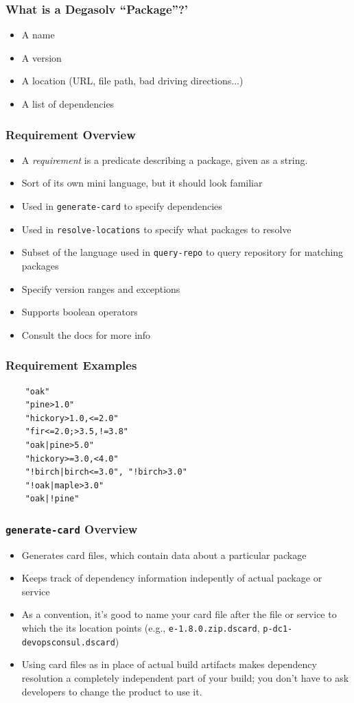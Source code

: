 \documentclass{beamer}
\begin{document}
\begin{frame}
  \frametitle{What is a Degasolv ``Package''?'}
  \begin{itemize}
  \item A name
  \item A version
  \item A location (URL, file path, bad driving directions...)
  \item A list of dependencies
  \end{itemize}
\end{frame}
\begin{frame}
  \frametitle{Requirement Overview}
  \begin{itemize}
      \item A \textit{requirement} is a predicate describing a package, given
          as a string.
  \item Sort of its own mini language, but it should look familiar
  \item Used in \texttt{generate-card} to specify dependencies
  \item Used in \texttt{resolve-locations} to specify what packages to resolve
  \item Subset of the language used in \texttt{query-repo} to query repository
      for matching packages
\item Specify version ranges and exceptions
  \item Supports boolean operators
  \item Consult the docs for more info
  \end{itemize}
\end{frame}
\begin{frame}[fragile]
  \frametitle{Requirement Examples}
\begin{verbatim}
    "oak"
    "pine>1.0"
    "hickory>1.0,<=2.0"
    "fir<=2.0;>3.5,!=3.8"
    "oak|pine>5.0"
    "hickory>=3.0,<4.0"
    "!birch|birch<=3.0", "!birch>3.0"
    "!oak|maple>3.0"
    "oak|!pine"
\end{verbatim}
\end{frame}
\begin{frame}
  \frametitle{\texttt{generate-card} Overview}
  \begin{itemize}
  \item Generates card files, which contain data about a particular package
  \item Keeps track of dependency information indepently of actual package or
      service
  \item As a convention, it's good to name your card file after the file or
      service to which the its location points (e.g.,
          \texttt{e-1.8.0.zip.dscard}, \texttt{p-dc1-devopsconsul.dscard})
  \item Using card files as in place of actual build artifacts makes
    dependency resolution a completely independent part of your build; you
    don't have to ask developers to change the product to use it.
  \end{itemize}
\end{frame}
\end{document}
